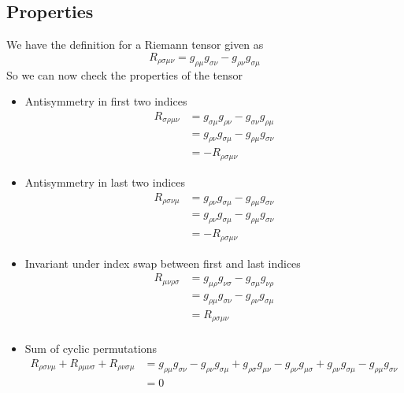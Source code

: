 \documentclass{article}
\begin{document}
		\subsection{Properties}
		We have the definition for a Riemann tensor given as
		$$ R_{\rho \sigma \mu \nu } = g_{\rho \mu} g_{\sigma \nu} - g_{\rho \nu} g_{\sigma \mu}$$
		So we can now check the properties of the tensor
		\begin{itemize}
			\item Antisymmetry in first two indices 
			\begin{align*}
				R_{\sigma\rho\mu\nu} &= g_{\sigma \mu} g_{\rho \nu} - g_{\sigma \nu} g_{\rho \mu} \\
				&= g_{\rho \nu} g_{\sigma \mu} - g_{\rho \mu} g_{\sigma \nu} \\
				&= - R_{\rho \sigma \mu \nu}
			\end{align*}
			\item Antisymmetry in last two indices
			\begin{align*}
				R_{\rho \sigma \nu \mu } &= g_{\rho \nu} g_{\sigma \mu} - g_{\rho \mu} g_{\sigma \nu} \\
				&= g_{\rho \nu} g_{\sigma \mu} - g_{\rho \mu} g_{\sigma \nu} \\
				&= - R_{\rho \sigma \mu \nu }
			\end{align*}
			\item Invariant under index swap between first and last indices
			\begin{align*}
				R_{\mu \nu \rho \sigma } &= g_{\mu\rho} g_{\nu \sigma} - g_{\sigma \mu} g_{\nu \rho} \\
				&= g_{\rho \mu} g_{\sigma \nu} - g_{\rho \nu} g_{\sigma \mu} \\
				&= R_{\rho \sigma \mu \nu } \\
			\end{align*}
			\item Sum of cyclic permutations
			\begin{align*}
				R_{\rho \sigma \nu \mu } + R_{\rho \mu \nu \sigma } + R_{\rho \nu \sigma \mu } &= g_{\rho \mu} g_{\sigma \nu} - g_{\rho \nu} g_{\sigma \mu} + g_{\rho \sigma} g_{\mu \nu} - g_{\rho \nu} g_{\mu \sigma} + g_{\rho \nu} g_{\sigma \mu} - g_{\rho \mu} g_{\sigma \nu} \\
				&= 0
			\end{align*}
		\end{itemize}
	\pagebreak
		
\end{document}
